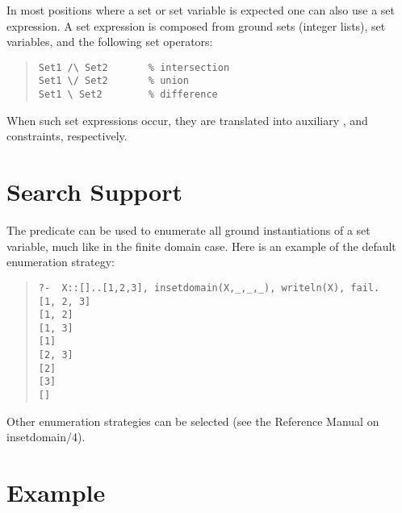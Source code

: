 In most positions where a set or set variable is expected one can also
use a set expression. A set expression is composed from ground sets
(integer lists), set variables, and the following set operators:
\begin{quote}\begin{verbatim}
Set1 /\ Set2       % intersection
Set1 \/ Set2       % union
Set1 \ Set2        % difference
\end{verbatim}\end{quote}
When such set expressions occur, they are translated into auxiliary
,
 and
constraints, respectively.


\section{Search Support}

The
predicate can be used to enumerate all ground instantiations of a set
variable, much like
in the finite domain case. 
Here is an example of the default enumeration strategy:
\begin{quote}\begin{verbatim}
?-  X::[]..[1,2,3], insetdomain(X,_,_,_), writeln(X), fail.
[1, 2, 3]
[1, 2]
[1, 3]
[1]
[2, 3]
[2]
[3]
[]
\end{verbatim}\end{quote}
Other enumeration strategies can be selected (see the Reference Manual
on insetdomain/4).




\section{Example}

